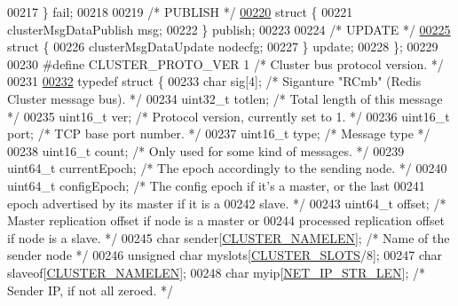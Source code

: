 \begin{DoxyCode}
00217     \} fail;
00218 
00219     \textcolor{comment}{/* PUBLISH */}
\hyperlink{structclusterMsgData_8publish}{00220}     \textcolor{keyword}{struct} \{
00221         clusterMsgDataPublish msg;
00222     \} publish;
00223 
00224     \textcolor{comment}{/* UPDATE */}
\hyperlink{structclusterMsgData_8update}{00225}     \textcolor{keyword}{struct} \{
00226         clusterMsgDataUpdate nodecfg;
00227     \} update;
00228 \};
00229 
00230 \textcolor{preprocessor}{#}\textcolor{preprocessor}{define} \textcolor{preprocessor}{CLUSTER\_PROTO\_VER} 1 \textcolor{comment}{/* Cluster bus protocol version. */}
00231 
\hyperlink{structclusterMsg}{00232} \textcolor{keyword}{typedef} \textcolor{keyword}{struct} \{
00233     \textcolor{keywordtype}{char} sig[4];        \textcolor{comment}{/* Siganture "RCmb" (Redis Cluster message bus). */}
00234     uint32\_t totlen;    \textcolor{comment}{/* Total length of this message */}
00235     uint16\_t ver;       \textcolor{comment}{/* Protocol version, currently set to 1. */}
00236     uint16\_t port;      \textcolor{comment}{/* TCP base port number. */}
00237     uint16\_t type;      \textcolor{comment}{/* Message type */}
00238     uint16\_t count;     \textcolor{comment}{/* Only used for some kind of messages. */}
00239     uint64\_t currentEpoch;  \textcolor{comment}{/* The epoch accordingly to the sending node. */}
00240     uint64\_t configEpoch;   \textcolor{comment}{/* The config epoch if it's a master, or the last}
00241 \textcolor{comment}{                               epoch advertised by its master if it is a}
00242 \textcolor{comment}{                               slave. */}
00243     uint64\_t offset;    \textcolor{comment}{/* Master replication offset if node is a master or}
00244 \textcolor{comment}{                           processed replication offset if node is a slave. */}
00245     \textcolor{keywordtype}{char} sender[\hyperlink{cluster_8h_ace7a882972eff7149675252938643b6e}{CLUSTER\_NAMELEN}]; \textcolor{comment}{/* Name of the sender node */}
00246     \textcolor{keywordtype}{unsigned} \textcolor{keywordtype}{char} myslots[\hyperlink{cluster_8h_aa3e2cb951eebb16725ecc3f5beefd9fd}{CLUSTER\_SLOTS}/8];
00247     \textcolor{keywordtype}{char} slaveof[\hyperlink{cluster_8h_ace7a882972eff7149675252938643b6e}{CLUSTER\_NAMELEN}];
00248     \textcolor{keywordtype}{char} myip[\hyperlink{server_8h_ad97c5405ed22a94e9fcc10fba577d6c0}{NET\_IP\_STR\_LEN}];    \textcolor{comment}{/* Sender IP, if not all zeroed. */}

\end{DoxyCode}
